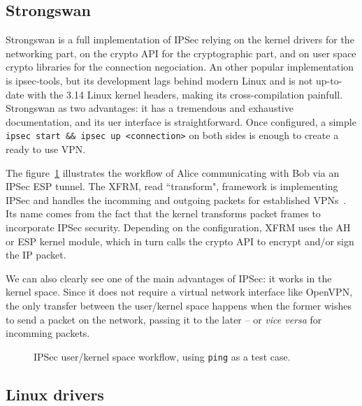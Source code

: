 

\subsection{Strongswan}
Strongswan is a full implementation of IPSec relying on the kernel drivers for the networking part, on the crypto API for the cryptographic part, and on user space crypto libraries for the connection negociation.
An other popular implementation is ipsec-tools, but its development lags behind modern Linux and is not up-to-date with the 3.14 Linux kernel headers, making its cross-compilation painfull.
Strongswan as two advantages: it has a tremendous and exhaustive documentation, and its uer interface is straightforward.
Once configured, a simple \texttt{ipsec start \&\& ipsec up <connection>} on both sides is enough to create a ready to use VPN.

The figure~\ref{fig:ipsec-workflow} illustrates the workflow of Alice communicating with Bob via an IPSec ESP tunnel.
The XFRM, read ``transform", framework is implementing IPSec and handles the incomming and outgoing packets for established VPNs~\cite{rosen2014}.
Its name comes from the fact that the kernel transforms packet frames to incorporate IPSec security.
Depending on the configuration, XFRM uses the AH or ESP kernel module, which in turn calls the crypto API to encrypt and/or sign the IP packet.

We can also clearly see one of the main advantages of IPSec: it works in the kernel space.
Since it does not require a virtual network interface like OpenVPN, the only transfer between the user/kernel space happens when the former wishes to send a packet on the network, passing it to the later -- or \textit{vice versa} for incomming packets.

\begin{figure}[ht]
\Large
\resizebox{\linewidth}{!}{%

}
\caption{IPSec user/kernel space workflow, using \texttt{ping} as a test case.}{}
\label{fig:ipsec-workflow}
\end{figure}


\subsection{Linux drivers}

